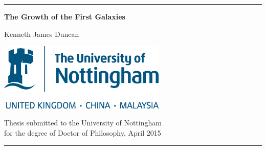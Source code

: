 %
%

\newcommand{\HRule}{\rule{\linewidth}{1mm}}
\begin{titlepage}

\begin{center}

\HRule


\setmainfont{Verdana} %
\LARGE{\textbf{The Growth of the First Galaxies}}


\large{Kenneth James Duncan}



\includegraphics[width=0.6\textwidth]{UoN_BlueCMYK.eps}


	Thesis submitted to the University of Nottingham\\
	for the degree of Doctor of Philosophy, April 2015\\


\HRule
\end{center}

\end{titlepage}


